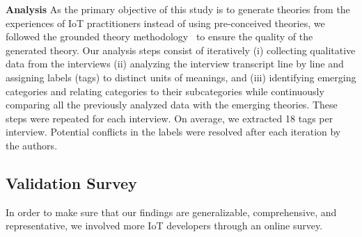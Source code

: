 \textbf{Analysis} \label{interviewAnalysis}
As the primary objective of this study is to generate theories from the experiences of IoT practitioners instead of using pre-conceived theories, we followed the grounded theory methodology~\cite{grounded2007} to ensure the quality of the generated theory. Our analysis steps consist of iteratively (i) collecting qualitative data from the interviews (ii)  analyzing the interview transcript line by line and assigning labels (tags) to distinct units of meanings, and (iii) identifying emerging categories and relating categories to their subcategories while continuously comparing all the previously analyzed data with the emerging theories. These steps were repeated for each interview. On average, we extracted 18 tags per interview. Potential conflicts in the labels were resolved after each iteration by the authors. 

\subsection{Validation Survey}
In order to make sure that our findings are generalizable, comprehensive, and representative, we involved more IoT developers through an online survey. 

